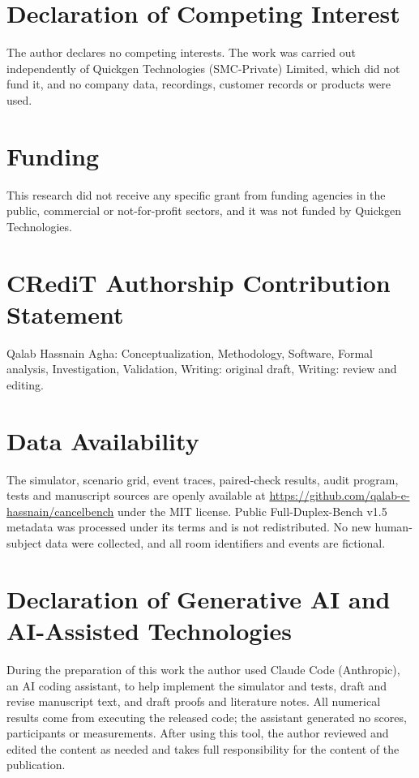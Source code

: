\documentclass[review,12pt]{elsarticle}
\begin{document}
\section*{Declaration of Competing Interest}

The author declares no competing interests. The work was carried out independently of Quickgen Technologies (SMC-Private) Limited, which did not fund it, and no company data, recordings, customer records or products were used.


\section*{Funding}

This research did not receive any specific grant from funding agencies in the public, commercial or not-for-profit sectors, and it was not funded by Quickgen Technologies.


\section*{CRediT Authorship Contribution Statement}

Qalab Hassnain Agha: Conceptualization, Methodology, Software, Formal analysis, Investigation, Validation, Writing: original draft, Writing: review and editing.


\section*{Data Availability}

The simulator, scenario grid, event traces, paired-check results, audit program, tests and manuscript sources are openly available at \url{https://github.com/qalab-e-hassnain/cancelbench} under the MIT license. Public Full-Duplex-Bench v1.5 metadata was processed under its terms and is not redistributed. No new human-subject data were collected, and all room identifiers and events are fictional.


\section*{Declaration of Generative AI and AI-Assisted Technologies}

During the preparation of this work the author used Claude Code (Anthropic), an AI coding assistant, to help implement the simulator and tests, draft and revise manuscript text, and draft proofs and literature notes. All numerical results come from executing the released code; the assistant generated no scores, participants or measurements. After using this tool, the author reviewed and edited the content as needed and takes full responsibility for the content of the publication.
\end{document}
